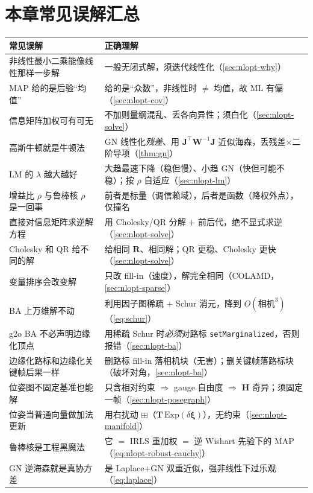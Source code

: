\section*{本章常见误解汇总}
\begin{table}[H]\centering\small
\begin{tabular}{p{} p{}}
\toprule
\textbf{常见误解} & \textbf{正确理解} \\
\midrule
非线性最小二乘能像线性那样一步解 & 一般无闭式解，须迭代线性化（\cref{sec:nlopt-why}）\\
MAP 给的是后验“均值” & 给的是“众数”，非线性时 $\ne$ 均值，故 ML 有偏（\cref{sec:nlopt-cov}）\\
信息矩阵加权可有可无 & 不加则量纲混乱、丢各向异性；须白化（\cref{sec:nlopt-solve}）\\
高斯牛顿就是牛顿法 & GN 线性化\emph{残差}、用 $\mathbf{J}^\top\mathbf{W}^{-1}\mathbf{J}$ 近似海森，丢残差$\times$二阶导项（\cref{thm:gn}）\\
LM 的 $\lambda$ 越大越好 & 大趋最速下降（稳但慢）、小趋 GN（快但可能不稳）；按 $\rho$ 自适应（\cref{sec:nlopt-lm}）\\
增益比 $\rho$ 与鲁棒核 $\rho$ 是一回事 & 前者是标量（调信赖域），后者是函数（降权外点），仅撞名 \\
直接对信息矩阵求逆解方程 & 用 Cholesky/QR 分解 $+$ 前后代，绝不显式求逆（\cref{sec:nlopt-solve}）\\
Cholesky 和 QR 给不同的解 & 给相同 $\mathbf{R}$、相同解；QR 更稳、Cholesky 更快（\cref{sec:nlopt-solve}）\\
变量排序会改变解 & 只改 fill-in（速度），解完全相同（COLAMD，\cref{sec:nlopt-sparse}）\\
BA 上万维解不动 & 利用因子图稀疏 $+$ Schur 消元，降到 $O(\text{相机}^3)$（\cref{eq:schur}）\\
g2o BA 不必声明边缘化顶点 & 用稀疏 Schur 时\emph{必须}对路标 \texttt{setMarginalized}，否则报错（\cref{sec:nlopt-ba}）\\
边缘化路标和边缘化关键帧后果一样 & 删路标 fill-in 落相机块（无害）；删关键帧落路标块（破坏对角，\cref{sec:nlopt-ba}）\\
位姿图不固定基准也能解 & 只含相对约束 $\Rightarrow$ gauge 自由度 $\Rightarrow$ $\mathbf{H}$ 奇异；须固定一帧（\cref{sec:nlopt-posegraph}）\\
位姿当普通向量做加法更新 & 用右扰动 $\boxplus$（$\mathbf{T}\,\mathrm{Exp}(\delta\boldsymbol{\xi})$），无约束（\cref{sec:nlopt-manifold}）\\
鲁棒核是工程黑魔法 & 它 $=$ IRLS 重加权 $=$ 逆 Wishart 先验下的 MAP（\cref{eq:nlopt-robust-cauchy}）\\
GN 逆海森就是真协方差 & 是 Laplace$+$GN 双重近似，强非线性下过乐观（\cref{eq:laplace}）\\
\bottomrule
\end{tabular}
\end{table}

